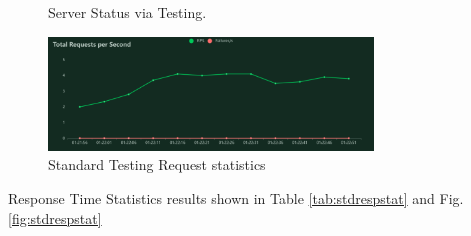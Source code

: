 \documentclass[journal]{IEEEtran}
\begin{document}
  \begin{figure}[!t]
    \centering
    \hfill
    \hfill
    \hfill
  \caption{Server Status via Testing.}
  \label{fig:srvstats} 
\end{figure}

\begin{figure}[h]
  \centering
  \includegraphics[width=3.4in]{figures/stdreqstat.png}
  \caption{Standard Testing Request statistics}
  \label{fig:stdreqstat}
  \end{figure}


Response Time Statistics results shown in Table \ref{tab:stdrespstat} and Fig.\ref{fig:stdrespstat}
\end{document}
